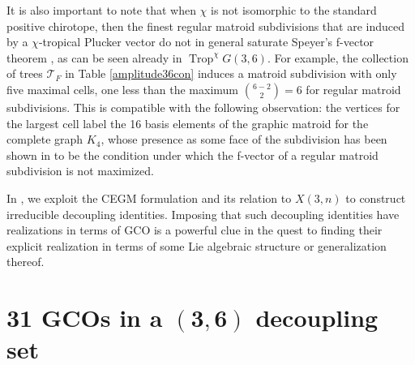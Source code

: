 \documentclass[pdftex]{sigma}
\theoremstyle{definition}
\numberwithin{equation}{section}
\begin{document}
It is also important to note that when $\chi$ is not isomorphic to the standard positive chirotope, then the finest regular matroid subdivisions that are induced by a $\chi$-tropical Plucker vector do not in general saturate Speyer's f-vector theorem \cite{speyer2009matroid}, as can be seen already in $\operatorname{Trop}^\chi G(3,6)$. For example, the collection of trees $\mathcal{T}_F$ in Table \ref{amplitude36con} induces a matroid subdivision with only five maximal cells, one less than the maximum $\binom{6-2}{2}=6$ for regular matroid subdivisions. This is compatible with the following observation: the vertices for the largest cell label the 16 basis elements of the graphic matroid for the complete graph $K_4$, whose presence as some face of the subdivision has been shown in \cite{speyer2009matroid} to be the condition under which the f-vector of a regular matroid subdivision is not maximized.

In \cite{Cachazo:2023ltw}, we exploit the CEGM formulation and its relation to $X(3,n)$ to construct irreducible decoupling identities. Imposing that such decoupling identities have realizations in terms of GCO is a powerful clue in the quest to finding their explicit realization in terms of some Lie algebraic structure or generalization thereof.

\appendix

 \section[31 GCOs in a (3,6) decoupling set]{31 GCOs in a $\boldsymbol{(3,6)}$ decoupling set} \label{31termsec}

\allowdisplaybreaks
\end{document}
